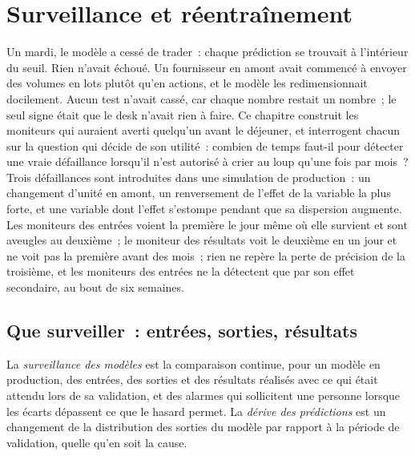 \chapter{Surveillance et réentraînement}\label{ch:ml:monitoring-and-retraining}

Un mardi, le modèle a cessé de trader~: chaque prédiction se trouvait à l'intérieur du seuil. Rien n'avait échoué. Un fournisseur en amont avait
commencé à envoyer des volumes en lots plutôt qu'en actions, et le modèle les redimensionnait docilement. Aucun test n'avait cassé, car chaque
nombre restait un nombre~; le seul signe était que le desk n'avait rien à faire. Ce chapitre construit les moniteurs qui auraient
averti quelqu'un avant le déjeuner, et interrogent chacun sur la question qui décide de son utilité~: combien de temps faut-il pour
détecter une vraie défaillance lorsqu'il n'est autorisé à crier au loup qu'une fois par mois~? Trois défaillances sont introduites dans une simulation de production~: un
changement d'unité en amont, un renversement de l'effet de la variable la plus forte, et une variable dont l'effet s'estompe pendant que sa dispersion augmente.
Les moniteurs des entrées voient la première le jour même où elle survient et sont aveugles au deuxième~; le moniteur des résultats voit le deuxième en un
jour et ne voit pas la première avant des mois~; rien ne repère la perte de précision de la troisième, et les moniteurs des entrées ne la détectent que par son
effet secondaire, au bout de six semaines.

\section{Que surveiller~: entrées, sorties, résultats}

\begin{definition}\label{def:ml:monitoring-and-retraining:monitoring}
La \emph{surveillance des modèles} est la comparaison continue, pour un modèle en production, des entrées, des sorties et
des résultats réalisés avec ce qui était attendu lors de sa validation, et des alarmes qui sollicitent une personne lorsque les écarts dépassent
ce que le hasard permet. La \emph{dérive des prédictions} est un changement de la distribution des sorties du modèle par rapport
à la période de validation, quelle qu'en soit la cause.
\end{definition}

